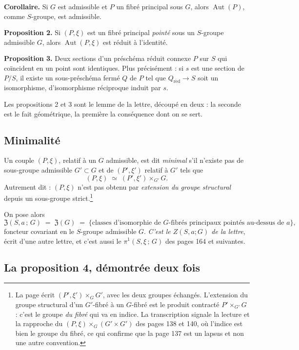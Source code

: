 \documentclass[11pt,a4paper]{article}
\begin{document}
\textbf{Corollaire.} Si $G$ est admissible et $P$ un fibré principal sous $G$,
alors $\operatorname{Aut}(P)$, comme $S$-groupe, est admissible.

\textbf{Proposition 2.} Si $(P, \xi)$ est un fibré principal \emph{pointé} sous
un $S$-groupe admissible $G$, alors $\operatorname{Aut}(P, \xi)$ est réduit à
l'identité.

\textbf{Proposition 3.} Deux sections d'un préschéma réduit connexe $P$ sur $S$
qui coïncident en un point sont identiques. Plus précisément : si $s$ est une
section de $P/S$, il existe un sous-préschéma fermé $Q$ de $P$ tel que
$Q_{\mathrm{r\acute{e}d}} \to S$ soit un isomorphisme, d'isomorphisme
réciproque induit par $s$.

Les propositions 2 et 3 sont le lemme de la lettre, découpé en deux : la
seconde est le fait géométrique, la première la conséquence dont on se sert.

\subsection*{Minimalité}

Un couple $(P, \xi)$, relatif à un $G$ admissible, est dit \emph{minimal} s'il
n'existe pas de sous-groupe admissible $G' \subset G$ et de $(P', \xi')$
relatif à $G'$ tels que
\[
  (P, \xi) \;\simeq\; (P', \xi') \times_{G'} G .
\]
Autrement dit : $(P,\xi)$ n'est pas obtenu par \emph{extension du groupe
structural} depuis un sous-groupe strict.\footnote{La page écrit
$(P',\xi') \times_{G} G'$, avec les deux groupes échangés. L'extension du
groupe structural d'un $G'$-fibré à un $G$-fibré est le produit contracté
$P' \times_{G'} G$ : c'est le groupe \emph{du fibré} qui va en indice. La
transcription signale la lecture et la rapproche du $(P,\xi) \times_{G}
(G' \times G')$ des pages 138 et 140, où l'indice est bien le groupe du fibré,
ce qui confirme que la page 137 est un lapsus et non une autre convention.}

On pose alors
\[
  \mathfrak{Z}(S, a\,;\, G) \;=\; \mathfrak{Z}(G) \;=\;
  \bigl\{\text{classes d'isomorphie de $G$-fibrés principaux pointés au-dessus
  de } a\bigr\} ,
\]
foncteur covariant en le $S$-groupe admissible $G$. \emph{C'est le $Z(S,a;G)$
de la lettre}, écrit d'une autre lettre, et c'est aussi le
$\pi^{1}(S,\xi\,;\,G)$ des pages 164 et suivantes.

\subsection*{La proposition 4, démontrée deux fois}
\end{document}
